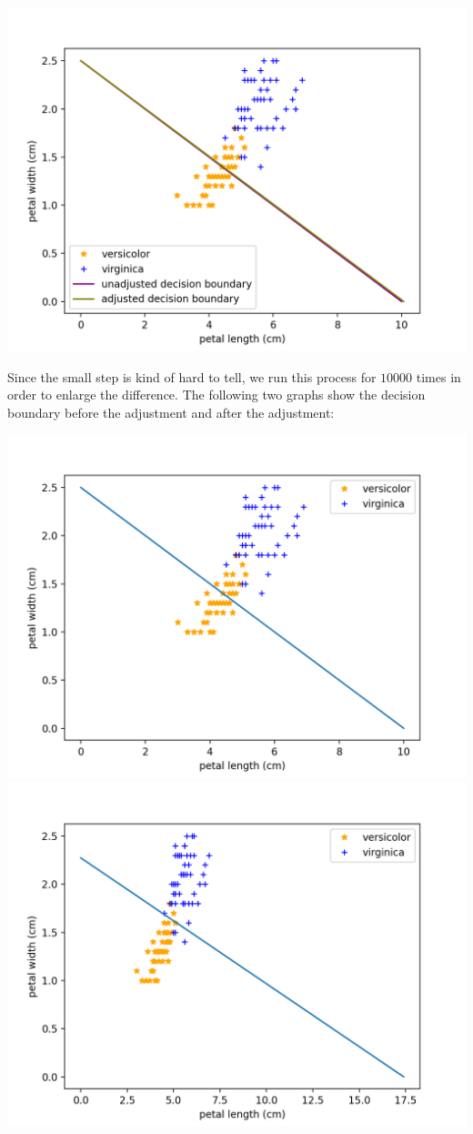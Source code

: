\documentclass[12pt]{article}
\begin{document}
\begin{center}
    \includegraphics[scale=0.6]{fig/p2e1.png}
\end{center}
Since the small step is kind of hard to tell, we run this process for $10000$ times in order to enlarge the difference. The following two graphs show the decision boundary before the
adjustment and after the adjustment: 
\begin{center}
    \includegraphics[scale=0.4]{fig/p2e2.png} 
    \includegraphics[scale=0.4]{fig/p2e3.png}
\end{center}
\end{document}
